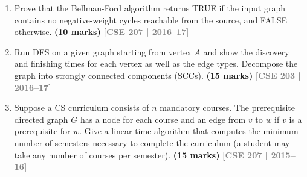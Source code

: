\documentclass[12pt,a3paper]{article}
\newcommand{\yr}[1]{\hfill\textcolor{gray}{\small\textbf{[#1]}}}
\newcommand{\mk}[1]{\textcolor{orange!70!black}{\small\textbf{(#1 marks)}}}
\begin{document}
\begin{enumerate}
\item Prove that the Bellman-Ford algorithm returns TRUE if the input graph contains no negative-weight cycles reachable from the source, and FALSE otherwise. \mk{10}
\yr{CSE 207 | 2016--17}

\item Run DFS on a given graph starting from vertex $A$ and show the discovery and finishing times for each vertex as well as the edge types. Decompose the graph into strongly connected components (SCCs). \mk{15}
\yr{CSE 203 | 2016--17}

\begin{center}
\end{center}


\item Suppose a CS curriculum consists of $n$ mandatory courses. The prerequisite directed graph $G$ has a node for each course and an edge from $v$ to $w$ if $v$ is a prerequisite for $w$. Give a linear-time algorithm that computes the minimum number of semesters necessary to complete the curriculum (a student may take any number of courses per semester). \mk{15}
\yr{CSE 207 | 2015--16}


\end{enumerate}
\end{document}

